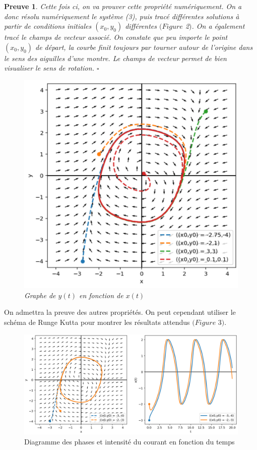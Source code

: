 \documentclass{article}
\newtheorem{preuve}{Preuve}
\begin{document}
\begin{preuve}

Cette fois ci, on va prouver cette propriété numériquement. 
On a donc résolu numériquement le système (3), puis tracé différentes solutions à partir de conditions initiales $(x_0,y_0)$ différentes $(Figure$ 2$)$.
On a également tracé le champs de vecteur associé. On constate que peu importe le point $(x_0,y_0)$ de départ, la courbe finit toujours par tourner autour de l'origine dans le sens des aiguilles d'une montre.
Le champs de vecteur permet de bien visualiser le sens de rotation. $\square$

\begin{figure}[!h]
\centering
\includegraphics[scale=0.4]{../images/plot_solh.png}
\caption{Graphe de $y(t)$ en fonction de $x(t)$}
\end{figure}

\end{preuve}

On admettra la preuve des autres propriétés. On peut cependant utiliser le schéma de Runge Kutta pour montrer les résultats attendus $(Figure$ 3$)$.

\begin{figure}[!h]
\centering
\includegraphics[scale=0.4]{../images/dphase.png}
\caption{Diagramme des phases et intensité du courant en fonction du temps}
\end{figure}
\end{document}
